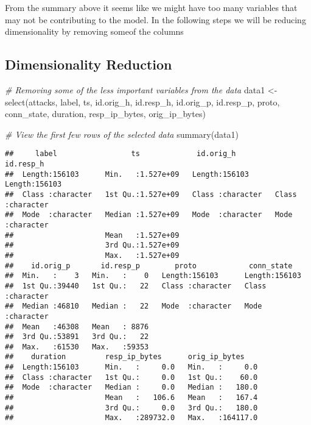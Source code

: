 \documentclass[
]{article}
\newenvironment{Shaded}{\begin{snugshade}}{\end{snugshade}}
\newcommand{\CommentTok}[1]{\textcolor[rgb]{0.56,0.35,0.01}{\textit{#1}}}
\newcommand{\FunctionTok}[1]{\textcolor[rgb]{0.00,0.00,0.00}{#1}}
\newcommand{\NormalTok}[1]{#1}
\newcommand{\OtherTok}[1]{\textcolor[rgb]{0.56,0.35,0.01}{#1}}
\begin{document}
From the summary above it seems like we might have too many variables
that may not be contributing to the model. In the following steps we
will be reducing dimensionality by removing someof the columns

\hypertarget{dimensionality-reduction}{%
\subsection{Dimensionality Reduction}\label{dimensionality-reduction}}

\begin{Shaded}
\begin{Highlighting}[]
\CommentTok{\# Removing some of the less  important variables from the data }
\NormalTok{data1 }\OtherTok{\textless{}{-}} \FunctionTok{select}\NormalTok{(attacks, }
\NormalTok{                        label, ts,}
\NormalTok{                        id.orig\_h, id.resp\_h, }
\NormalTok{                        id.orig\_p, id.resp\_p, }
\NormalTok{                        proto, }
\NormalTok{                        conn\_state, duration, }
\NormalTok{                        resp\_ip\_bytes, orig\_ip\_bytes)}

\CommentTok{\# View the first few rows of the selected data}
\FunctionTok{summary}\NormalTok{(data1)}
\end{Highlighting}
\end{Shaded}

\begin{verbatim}
##     label                 ts             id.orig_h          id.resp_h        
##  Length:156103      Min.   :1.527e+09   Length:156103      Length:156103     
##  Class :character   1st Qu.:1.527e+09   Class :character   Class :character  
##  Mode  :character   Median :1.527e+09   Mode  :character   Mode  :character  
##                     Mean   :1.527e+09                                        
##                     3rd Qu.:1.527e+09                                        
##                     Max.   :1.527e+09                                        
##    id.orig_p       id.resp_p        proto            conn_state       
##  Min.   :    3   Min.   :    0   Length:156103      Length:156103     
##  1st Qu.:39440   1st Qu.:   22   Class :character   Class :character  
##  Median :46810   Median :   22   Mode  :character   Mode  :character  
##  Mean   :46308   Mean   : 8876                                        
##  3rd Qu.:53891   3rd Qu.:   22                                        
##  Max.   :61530   Max.   :59353                                        
##    duration         resp_ip_bytes      orig_ip_bytes     
##  Length:156103      Min.   :     0.0   Min.   :     0.0  
##  Class :character   1st Qu.:     0.0   1st Qu.:    60.0  
##  Mode  :character   Median :     0.0   Median :   180.0  
##                     Mean   :   106.6   Mean   :   167.4  
##                     3rd Qu.:     0.0   3rd Qu.:   180.0  
##                     Max.   :289732.0   Max.   :164117.0
\end{verbatim}
\end{document}
